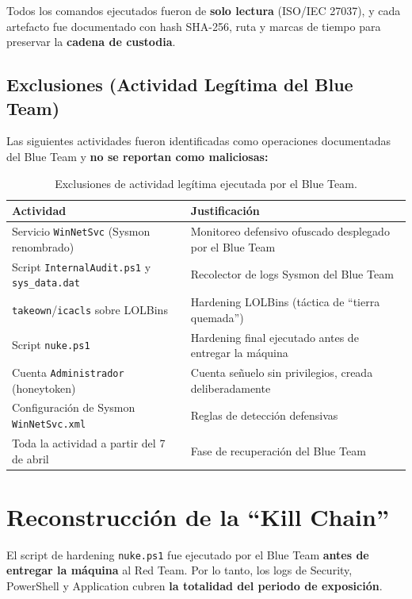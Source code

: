 Todos los comandos ejecutados fueron de \textbf{solo lectura} (ISO/IEC 27037), y cada artefacto fue documentado con hash SHA-256, ruta y marcas de tiempo para preservar la \textbf{cadena de custodia}.

\subsection{Exclusiones (Actividad Legítima del Blue Team)}
Las siguientes actividades fueron identificadas como operaciones documentadas del Blue Team y \textbf{no se reportan como maliciosas:}

\begin{table}[htbp]
\centering
\setlength{\tabcolsep}{6pt}
\small
\begin{tabular}{|p{}|p{}|}
\hline
\textbf{Actividad} & \textbf{Justificación} \\ \hline
Servicio \texttt{WinNetSvc} (Sysmon renombrado) & Monitoreo defensivo ofuscado desplegado por el Blue Team \\ \hline
Script \texttt{InternalAudit}\allowbreak\texttt{.ps1} y \texttt{sys\_}\allowbreak\texttt{data.dat} & Recolector de logs Sysmon del Blue Team \\ \hline
\texttt{takeown}/\allowbreak\texttt{icacls} sobre LOLBins & Hardening LOLBins (táctica de ``tierra quemada'') \\ \hline
Script \texttt{nuke.ps1} & Hardening final ejecutado antes de entregar la máquina \\ \hline
Cuenta \texttt{Administrador} (honeytoken) & Cuenta señuelo sin privilegios, creada deliberadamente \\ \hline
Configuración de Sysmon \texttt{WinNetSvc}\allowbreak\texttt{.xml} & Reglas de detección defensivas \\ \hline
Toda la actividad a partir del 7 de abril & Fase de recuperación del Blue Team \\ \hline
\end{tabular}
\caption{Exclusiones de actividad legítima ejecutada por el Blue Team.}
\label{tab:exclusiones_blue_team}
\end{table}

\section[Reconstrucción de la Kill Chain]{Reconstrucción de la ``Kill Chain''}
\label{sec:reconstruccion_kill_chain}
El script de hardening \texttt{nuke.ps1} fue ejecutado por el Blue Team \textbf{antes de entregar la máquina} al Red Team. Por lo tanto, los logs de Security, PowerShell y Application cubren \textbf{la totalidad del periodo de exposición}.

